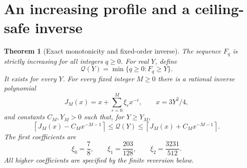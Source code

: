\documentclass[11pt,letterpaper]{article}
\newtheorem{theorem}{Theorem}[section]
\theoremstyle{remark}\newtheorem{remark}[theorem]{Remark}
\begin{document}
\section{An increasing profile and a ceiling-safe inverse}\label{wdn:edge:sec:inverse}
\begin{theorem}[Exact monotonicity and fixed-order inverse]\label{wdn:edge:thm:inverse}
The sequence $F_q$ is strictly increasing for all integers $q\ge0$.
For real $Y$, define
\[
 \mathcal Q(Y)=\min\{q\ge0:F_q\ge Y\}.
\]
It exists for every $Y$. For every fixed integer $M\ge0$ there is a
rational inverse polynomial
\begin{equation}\label{wdn:edge:eq:J}
 J_M(x)=x+\sum_{r=0}^M\xi_r x^{-r},\qquad x=3Y^2/4,
\end{equation}
and constants $C_M,Y_M>0$ such that, for $Y\ge Y_M$,
\begin{equation}\label{wdn:edge:eq:ceilinverse}
 \left\lceil J_M(x)-C_Mx^{-M-1}\right\rceil
 \le\mathcal Q(Y)\le
 \left\lceil J_M(x)+C_Mx^{-M-1}\right\rceil.
\end{equation}
The first coefficients are
\begin{equation}\label{wdn:edge:eq:xivalues}
 \xi_0=\frac78,\qquad \xi_1=\frac{203}{128},\qquad
 \xi_2=\frac{3231}{512}.
\end{equation}
All higher coefficients are specified by the finite reversion below.
\end{theorem}
\end{document}
